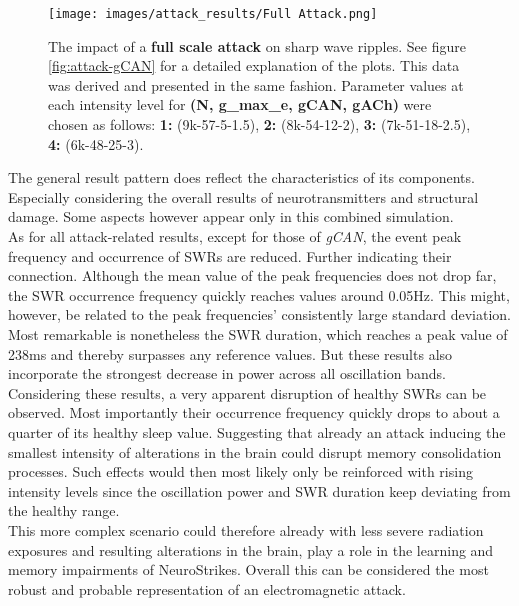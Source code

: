     \begin{figure}[htbp]
        \centering
        \texttt{[image: images/attack\_results/Full Attack.png]}
        \caption{The impact of a \textbf{full scale attack} on sharp wave ripples. See figure \ref{fig:attack-gCAN} for a detailed explanation of the plots. This data was derived and presented in the same fashion. Parameter values at each intensity level for \textbf{(N, g\_max\_e, gCAN, gACh)} were chosen as follows: \textbf{1:} (9k-57-5-1.5), \textbf{2:} (8k-54-12-2), \textbf{3:} (7k-51-18-2.5), \textbf{4:} (6k-48-25-3).}
        \label{fig:attack-Full}
    \end{figure}
    The general result pattern does reflect the characteristics of its components. Especially considering the overall results of neurotransmitters and structural damage. Some aspects however appear only in this combined simulation.\\
    As for all attack-related results, except for those of \textit{gCAN}, the event peak frequency and occurrence of SWRs are reduced. Further indicating their connection. 
    Although the mean value of the peak frequencies does not drop far, the SWR occurrence frequency quickly reaches values around 0.05Hz. This might, however, be related to the peak frequencies' consistently large standard deviation.\\
    Most remarkable is nonetheless the SWR duration, which reaches a peak value of 238ms and thereby surpasses any reference values. But these results also incorporate the strongest decrease in power across all oscillation bands.\\

    Considering these results, a very apparent disruption of healthy SWRs can be observed. Most importantly their occurrence frequency quickly drops to about a quarter of its healthy sleep value. Suggesting that already an attack inducing the smallest intensity of alterations in the brain could disrupt memory consolidation processes. Such effects would then most likely only be reinforced with rising intensity levels since the oscillation power and SWR duration keep deviating from the healthy range.\\
    This more complex scenario could therefore already with less severe radiation exposures and resulting alterations in the brain, play a role in the learning and memory impairments of NeuroStrikes. Overall this can be considered the most robust and probable representation of an electromagnetic attack. 
    
